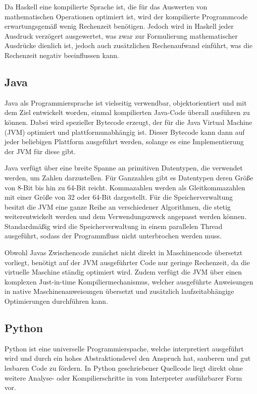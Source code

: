 \documentclass[11pt, parskip=half]{scrartcl}       %
\begin{document}
Da Haskell eine kompilierte Sprache ist, die für das Auswerten von mathematischen Operationen optimiert ist, wird der kompilierte Programmcode erwartungsgemäß wenig Rechenzeit benötigen.
Jedoch wird in Haskell jeder Ausdruck verzögert ausgewertet, was zwar zur Formulierung mathematischer Ausdrücke dienlich ist, jedoch auch zusätzlichen Rechenaufwand einführt, was die Rechenzeit negativ beeinflussen kann.


\subsection{Java}

Java\cite{java_language} als Programmiersprache ist vielseitig verwendbar, objektorientiert und mit dem Ziel entwickelt worden, einmal kompilierten Java-Code überall ausführen zu können.
Dabei wird spezieller Bytecode erzeugt, der für die Java Virtual Machine (JVM) optimiert und plattformunabhängig ist.
Dieser Bytecode kann dann auf jeder beliebigen Plattform ausgeführt werden, solange es eine Implementierung der JVM für diese gibt.

Java verfügt über eine breite Spanne an primitiven Datentypen, die verwendet werden, um Zahlen darzustellen.
Für Ganzzahlen gibt es Datentypen deren Größe von 8-Bit bis hin zu 64-Bit reicht.
Kommazahlen werden als Gleitkommazahlen mit einer Größe von 32 oder 64-Bit dargestellt.
Für die Speicherverwaltung besitzt die JVM eine ganze Reihe an verschiedener Algorithmen, die stetig weiterentwickelt werden und dem Verwendungszweck angepasst werden können.\cite{java_papers_garbage_collectors}
Standardmäßig wird die Speicherverwaltung in einem parallelen Thread ausgeführt, sodass der Programmfluss nicht unterbrochen werden muss.

Obwohl Javas Zwischencode zunächst nicht direkt in Maschinencode übersetzt vorliegt, benötigt auf der JVM ausgeführter Code nur geringe Rechenzeit, da die virtuelle Maschine ständig optimiert wird.
Zudem verfügt die JVM über einen komplexen Just-in-time Kompiliermechanismus, welcher ausgeführte Anweisungen in native Maschinenanweisungen übersetzt und zusätzlich laufzeitabhängige Optimierungen durchführen kann.


\subsection{Python}

Python\cite{python_language} ist eine universelle Programmierspache, welche interpretiert ausgeführt wird und durch ein hohes Abstraktionslevel den Anspruch hat, sauberen und gut lesbaren Code zu fördern.
In Python geschriebener Quellcode liegt direkt ohne weitere Analyse- oder Kompilierschritte in vom Interpreter ausführbarer Form vor.
\end{document}
